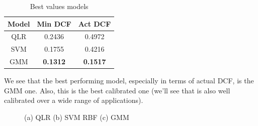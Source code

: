 \documentclass[12pt, a4paper]{article}
\begin{document}
\begin{table}[ht!]
	\centering
 	\begin{tabular}{| | c c c | |} 
 		\hline
 		Model & Min DCF & Act DCF\\
 		\hline\hline
 		QLR & 0.2436 & 0.4972\\
 		\hline
 		SVM & 0.1755 & 0.4216\\
 		\hline
 		GMM & \textbf{0.1312} & \textbf{0.1517}\\
 		\hline
 	\end{tabular}
	\caption{Best values models}
\end{table}

We see that the best performing model, especially in terms of actual DCF, is the GMM one. Also, this is the best calibrated one (we'll see that is also well calibrated over a wide range of applications).

\begin{figure}[ht]
    \centering
    \caption{(a) QLR (b) SVM RBF (c) GMM }
    \label{fig:Bayes plot all models}
\end{figure}
\end{document}
